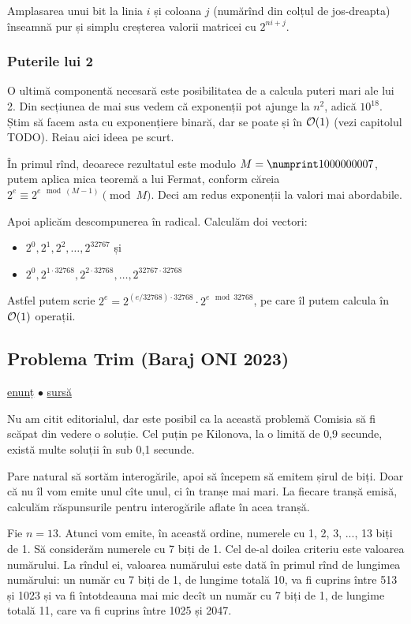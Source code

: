 \documentclass[../main.tex]{subfiles}
\begin{document}
Amplasarea unui bit la linia $i$ și coloana $j$ (numărînd din colțul de jos-dreapta) înseamnă pur și simplu creșterea valorii matricei cu $2^{ni + j}$.

\subsubsection*{Puterile lui 2}

O ultimă componentă necesară este posibilitatea de a calcula puteri mari ale lui 2. Din secțiunea de mai sus vedem că exponenții pot ajunge la $n^2$, adică $10^{18}$. Știm să facem asta cu exponențiere binară, dar se poate și în $\mathcal{O}(1)$ (vezi capitolul TODO). Reiau aici ideea pe scurt.

În primul rînd, deoarece rezultatul este modulo $M = \np{1000000007}$, putem aplica mica teoremă a lui Fermat, conform căreia $2^e \equiv 2^{e \mod (M-1)} \pmod{M}$. Deci am redus exponenții la valori mai abordabile.

Apoi aplicăm descompunerea în radical. Calculăm doi vectori:

\begin{itemize}
  \item $2^0, 2^1, 2^2, \dots, 2^{32767}$ și
  \item $2^0, 2^{1 \cdot 32768}, 2^{2 \cdot 32768}, \dots, 2^{32767 \cdot 32768}$
\end{itemize}

Astfel putem scrie $2^e = 2^{(e / 32768) \cdot 32768} \cdot 2^{e \mod 32768}$, pe care îl putem calcula în $\mathcal{O}(1)$ operații.

\subsection{Problema Trim (Baraj ONI 2023)}
\label{problem:trim}

\href{https://kilonova.ro/problems/564}{enunț}
$\bullet$
\hyperref[code:trim]{sursă}

Nu am citit editorialul, dar este posibil ca la această problemă Comisia să fi scăpat din vedere o soluție. Cel puțin pe Kilonova, la o limită de 0,9 secunde, există multe soluții în sub 0,1 secunde.

Pare natural să sortăm interogările, apoi să începem să emitem șirul de biți. Doar că nu îl vom emite unul cîte unul, ci în tranșe mai mari. La fiecare tranșă emisă, calculăm răspunsurile pentru interogările aflate în acea tranșă.

Fie $n = 13$. Atunci vom emite, în această ordine, numerele cu 1, 2, 3, ..., 13 biți de 1. Să considerăm numerele cu 7 biți de 1. Cel de-al doilea criteriu este valoarea numărului. La rîndul ei, valoarea numărului este dată în primul rînd de lungimea numărului: un număr cu 7 biți de 1, de lungime totală 10, va fi cuprins între 513 și 1023 și va fi întotdeauna mai mic decît un număr cu 7 biți de 1, de lungime totală 11, care va fi cuprins între 1025 și 2047.
\end{document}
